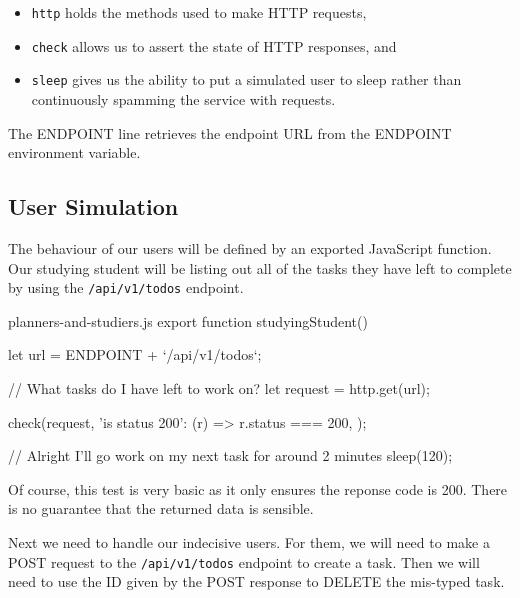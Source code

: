 \documentclass{csse4400}
\begin{document}
\begin{itemize}
    \item \texttt{http} holds the methods used to make HTTP requests,
    \item \texttt{check} allows us to assert the state of HTTP responses, and
    \item \texttt{sleep} gives us the ability to put a simulated user to sleep rather than continuously spamming the service with requests.
\end{itemize}

The ENDPOINT line retrieves the endpoint URL from the ENDPOINT environment variable.

\subsection{User Simulation}

The behaviour of our users will be defined by an exported JavaScript function.
Our studying student will be listing out all of the tasks they have left to complete by using the \texttt{/api/v1/todos} endpoint.

\begin{code}[language=JavaScript,numbers=none]{planners-and-studiers.js}
export function studyingStudent() {
    let url = ENDPOINT + `/api/v1/todos`;

    // What tasks do I have left to work on?
    let request = http.get(url);

    check(request, {
        'is status 200': (r) => r.status === 200,
    });
    
    // Alright I'll go work on my next task for around 2 minutes
    sleep(120);
}
\end{code}

Of course,
this test is very basic as it only ensures the reponse code is 200.
There is no guarantee that the returned data is sensible.


Next we need to handle our indecisive users.
For them, we will need to make a POST request to the \texttt{/api/v1/todos} endpoint to create a task.
Then we will need to use the ID given by the POST response to DELETE the mis-typed task.
\end{document}
